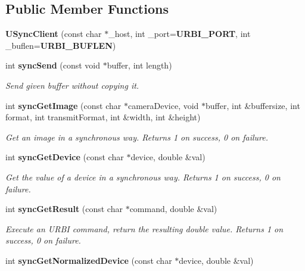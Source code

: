 \subsection*{Public Member Functions}
\begin{CompactItemize}
\item 
{\bf USync\-Client} (const char $\ast$\_\-host, int \_\-port={\bf URBI\_\-PORT}, int \_\-buflen={\bf URBI\_\-BUFLEN})\label{classUSyncClient_a0}

\item 
int {\bf sync\-Send} (const void $\ast$buffer, int length)\label{classUSyncClient_a1}

\begin{CompactList}\small\item\em Send given buffer without copying it. \item\end{CompactList}\item 
int {\bf sync\-Get\-Image} (const char $\ast$camera\-Device, void $\ast$buffer, int \&buffersize, int format, int transmit\-Format, int \&width, int \&height)\label{classUSyncClient_a2}

\begin{CompactList}\small\item\em Get an image in a synchronous way. Returns 1 on success, 0 on failure. \item\end{CompactList}\item 
int {\bf sync\-Get\-Device} (const char $\ast$device, double \&val)\label{classUSyncClient_a3}

\begin{CompactList}\small\item\em Get the value of a device in a synchronous way. Returns 1 on success, 0 on failure. \item\end{CompactList}\item 
int {\bf sync\-Get\-Result} (const char $\ast$command, double \&val)\label{classUSyncClient_a4}

\begin{CompactList}\small\item\em Execute an URBI command, return the resulting double value. Returns 1 on success, 0 on failure. \item\end{CompactList}\item 
int {\bf sync\-Get\-Normalized\-Device} (const char $\ast$device, double \&val)\label{classUSyncClient_a5}


\end{CompactItemize}
